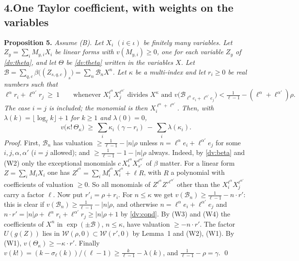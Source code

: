 \documentclass[11pt,letterpaper]{article}
\begin{document}
\subsection*{4.\quad One Taylor coefficient, with weights on the variables}

\textbf{Proposition 5.} \emph{Assume \textup{(B)}. Let $X_i$ $(i\in\iota)$ be finitely many variables. Let
$Z_y=\sum_iM_{y,i}X_i$ be linear forms with $v(M_{y,i})\ge0$, one for each variable $Z_y$ of
\eqref{dv:theta}, and let $\Theta$ be \eqref{dv:theta} written in the variables $X$. Let
$\mathcal B=\sum_{q,c}\beta\big((Z_{s,q,c})_s\big)=\sum_n\mathcal B_nX^n$. Let $\kappa$ be a multi-index and
let $r_i\ge0$ be real numbers such that}
\begin{equation}\label{dv:cond}
 \ell^\alpha r_i+\ell^{\alpha'} r_j\ \ge\ 1\qquad\text{whenever }X_i^{\ell^\alpha}X_j^{\ell^{\alpha'}}\text{ divides }
 X^\kappa\text{ and }v\big(\mathcal B_{\ell^\alpha e_i+\ell^{\alpha'} e_j}\big)<\tfrac1{\ell-1}-(\ell^\alpha+\ell^{\alpha'})\rho .
\end{equation}
\emph{The case $i=j$ is included; the monomial is then $X_i^{\ell^\alpha+\ell^{\alpha'}}$. Then, with
$\lambda(k)=\lfloor\log_\ell k\rfloor+1$ for $k\ge1$ and $\lambda(0)=0$,}
\begin{equation}\label{dv:jet}
 v\big(\kappa!\,\Theta_\kappa\big)\ \ge\ \sum_i\kappa_i\,(\gamma-r_i)\ -\ \sum_i\lambda(\kappa_i).
\end{equation}
\emph{Proof.} First, $\mathcal B_n$ has valuation $\ge\frac1{\ell-1}-|n|\rho$ unless $n=\ell^\alpha e_i+\ell^{\alpha'} e_j$
for some $i,j,\alpha,\alpha'$ ($i=j$ allowed); and $\ge\frac1{\ell-1}-1-|n|\rho$ always. Indeed, by \eqref{dv:beta} and (W2)
only the exceptional monomials $c\,X_s^{\ell^\alpha}X_{s'}^{\ell^{\alpha'}}$ of $\beta$ matter. For a linear form
$Z=\sum_iM_iX_i$ one has $Z^{\ell^\alpha}=\sum_iM_i^{\ell^\alpha}X_i^{\ell^\alpha}+\ell R$, with $R$ a polynomial with
coefficients of valuation $\ge0$. So all monomials of $Z^{\ell^\alpha}Z'^{\ell^{\alpha'}}$ other than the
$X_i^{\ell^\alpha}X_j^{\ell^{\alpha'}}$ carry a factor $\ell$. Now put $r'_i=\rho+r_i$. For $n\le\kappa$ we get
$v(\mathcal B_n)\ge\frac1{\ell-1}-n\cdot r'$: this is clear if $v(\mathcal B_n)\ge\frac1{\ell-1}-|n|\rho$, and
otherwise $n=\ell^\alpha e_i+\ell^{\alpha'} e_j$ and $n\cdot r'=|n|\rho+\ell^\alpha r_i+\ell^{\alpha'} r_j\ge|n|\rho+1$ by
\eqref{dv:cond}. By (W3) and (W4) the coefficients of $X^n$ in $\exp(\pm\mathcal B)$, $n\le\kappa$, have
valuation $\ge-n\cdot r'$. The factor $U(g(Z))$ lies in $\mathcal W(\rho,0)\subset\mathcal W(r',0)$ by
Lemma~1 and (W2), (W1). By (W1), $v(\Theta_\kappa)\ge-\kappa\cdot r'$. Finally
$v(k!)=(k-\sigma_\ell(k))/(\ell-1)\ge\frac k{\ell-1}-\lambda(k)$, and $\frac1{\ell-1}-\rho=\gamma$. \qed
\end{document}
